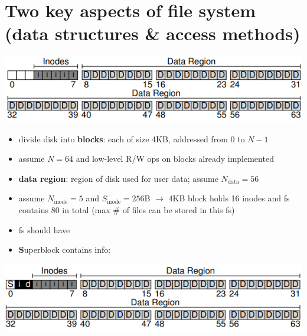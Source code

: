 \section*{Two key aspects of file system (data structures \& access methods)}
\includegraphics[width=\linewidth]{imgs/fs_simple_blocks1}
\begin{itemize}
\item divide disk into \textbf{blocks}: each of size 4KB, addressed from 0 to $N-1$
\item assume $N=64$ and low-level R/W ops on blocks already implemented
\item \textbf{data region}: region of disk used for user data; assume $N_{\text{data}} = 56$
\item assume $N_{\text{inode}}=5$ and $S_{\text{inode}}=256$B $\to$ 4KB block holds 16 inodes and fs contains 80 in total (max \# of files can be stored in this fs)
\item fs should have
\item \textbf{S}uperblock contains info:
\end{itemize}
\includegraphics[width=\linewidth]{imgs/fs_simple_blocks2}

